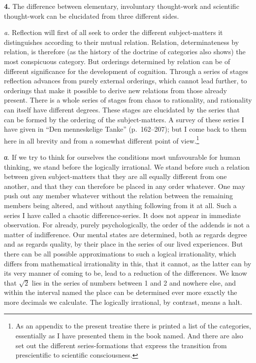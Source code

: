 \documentclass[12pt]{book}
\newcommand{\hnum}[1]{\textbf{#1.}\enspace}
\newcommand{\opage}[1]{\marginnote{\footnotesize\textit{[#1]}}}
\begin{document}
\hnum{4} The difference between elementary, involuntary thought-work and
scientific thought-work can be elucidated from three different sides.

\textit{a.} Reflection will first of all seek to order the different
subject-matters it distinguishes according to their mutual relation. Relation,
determinateness by relation, is therefore (as the history of the doctrine of
categories also shows) the most conspicuous category. But orderings determined
by relation can be of different significance for the development of cognition.
Through a series of stages reflection advances from purely external orderings,
which cannot lead further, to orderings that make it possible to derive new
relations from those already present. There is a whole series of stages from
chaos to rationality, and rationality can itself have different degrees. These
stages are elucidated by the series that can be formed by the ordering of the
subject-matters. A survey of \opage{9}these series I have given in ``Den menneskelige
Tanke'' (p.\ 162--207); but I come back to them here in all brevity and from a
somewhat different point of view.\footnote{As an appendix to the present
treatise there is printed a list of the categories, essentially as I have
presented them in the book named. And there are also set out the different
series-formations that express the transition from prescientific to scientific
consciousness.}

α. If we try to think for ourselves the conditions most unfavourable for human
thinking, we stand before the logically irrational. We stand before such a
relation between given subject-matters that they are all equally different from
one another, and that they can therefore be placed in any order whatever. One
may push out any member whatever without the relation between the remaining
members being altered, and without anything following from it at all. Such a
series I have called a chaotic difference-series. It does not appear in
immediate observation. For already, purely psychologically, the order of the
addends is not a matter of indifference. Our mental states are determined, both
as regards degree and as regards quality, by their place in the series of our
lived experiences. But there can be all possible approximations to such a
logical irrationality, which differs from mathematical irrationality in this,
that it cannot, as the latter can by its very manner of coming to be, lead to a
reduction of the differences. We know that $\sqrt{2}$ lies in the series of
numbers between 1 and 2 and nowhere else, and within the interval named the
place can be determined ever more exactly the more decimals we calculate. The
logically irrational, by contrast, means a halt.
\end{document}
